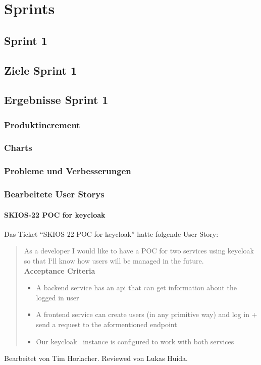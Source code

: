 
\chapter{Sprints}

\section{Sprint 1}

\section{Ziele Sprint 1}

\section{Ergebnisse Sprint 1}

\subsection{Produktincrement}
\subsection{Charts}

\subsection{Probleme und Verbesserungen}


\subsection{Bearbeitete User Storys}
\subsubsection{SKIOS-22 POC for keycloak}
Das Ticket \enquote{SKIOS-22 POC for keycloak} hatte folgende User Story:
\begin{quotation}
    As a developer I would like to have a POC for two services using keycloak~\parencite{web/Keycloak} so that I`ll know how users will be managed in the future. \\
    \textbf{Acceptance Criteria}
    \begin{itemize}
        \item A backend service has an api that can get information about the logged in user
        \item A frontend service can create users (in any primitive way) and log in + send a request to the aformentioned endpoint
        \item Our keycloak~\parencite{git/skiosa/orm} instance is configured to work with both services
    \end{itemize}
\end{quotation}
Bearbeitet von Tim Horlacher.
Reviewed von Lukas Huida.

